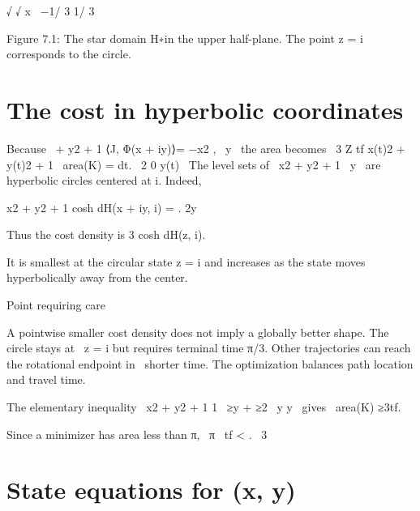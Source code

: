\begin{displaytext}
√ √ x \
−1/ 3 1/ 3
\end{displaytext}

\begin{figureplaceholder}
Figure 7.1: The star domain H∗in the upper half-plane. The point z = i corresponds to the circle.
\end{figureplaceholder}

\section{The cost in hyperbolic coordinates}

\begin{displaytext}
Because \
+ y2 + 1 ⟨J, Φ(x + iy)⟩= −x2 , \
y \
the area becomes \
3 Z tf x(t)2 + y(t)2 + 1 \
area(K) = dt. \
2 0 y(t) \
The level sets of \
x2 + y2 + 1 \
y \
are hyperbolic circles centered at i. Indeed,
\end{displaytext}

x2 + y2 + 1 cosh dH(x + iy, i) = . 2y


Thus the cost density is 3 cosh dH(z, i).


It is smallest at the circular state z = i and increases as the state moves hyperbolically away from the center.


\begin{insightbox}{Point requiring care}
\end{insightbox}

\begin{displaytext}
A pointwise smaller cost density does not imply a globally better shape. The circle stays at \
z = i but requires terminal time π/3. Other trajectories can reach the rotational endpoint in \
shorter time. The optimization balances path location and travel time.
\end{displaytext}

\begin{displaytext}
The elementary inequality \
x2 + y2 + 1 1 \
≥y + ≥2 \
y y \
gives \
area(K) ≥3tf.
\end{displaytext}

\begin{displaytext}
Since a minimizer has area less than π, \
π \
tf < . \
3
\end{displaytext}

\section{State equations for (x, y)}

